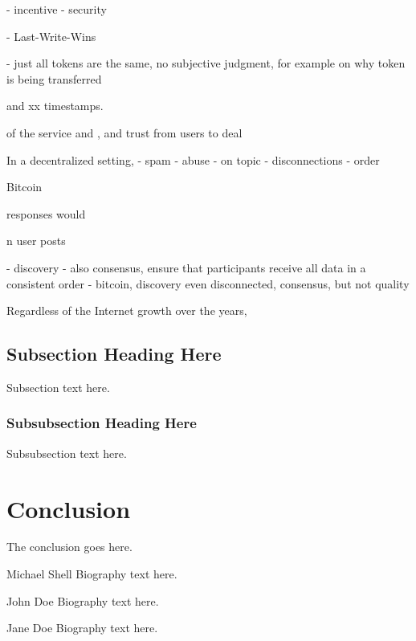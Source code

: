 \documentclass[10pt,journal,compsoc]{IEEEtran}
\begin{document}
- incentive
- security

- Last-Write-Wins

- just all tokens are the same, no subjective judgment, for example on why token is being transferred


 and xx timestamps.


 of the service and , and trust from users to deal

In a decentralized setting, 
    - spam
    - abuse
    - on topic
    - disconnections
    - order

Bitcoin

responses would




n user posts 

- discovery
- also consensus, ensure that participants receive all data in a consistent order
- bitcoin, discovery even disconnected, consensus, but not quality


Regardless of the Internet growth over the years,

\subsection{Subsection Heading Here}
Subsection text here.

\subsubsection{Subsubsection Heading Here}
Subsubsection text here.

\section{Conclusion}
The conclusion goes here.




\begin{IEEEbiography}{Michael Shell}
Biography text here.
\end{IEEEbiography}

\begin{IEEEbiographynophoto}{John Doe}
Biography text here.
\end{IEEEbiographynophoto}

\begin{IEEEbiographynophoto}{Jane Doe}
Biography text here.
\end{IEEEbiographynophoto}
\end{document}
